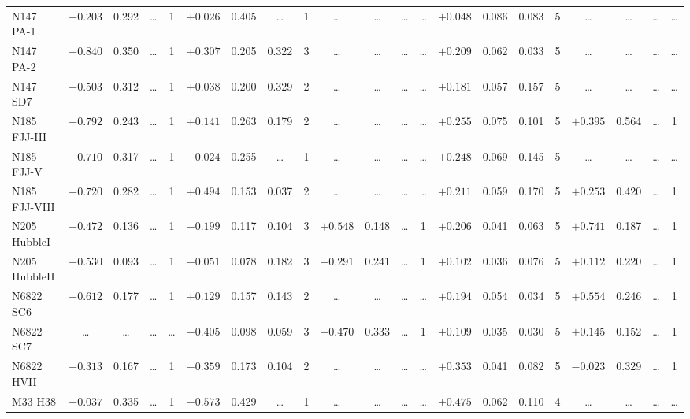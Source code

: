 \documentclass{aa}
\begin{document}
\begin{appendix}
\begin{table*}
\begin{adjustbox}{width=1\textwidth}
{\begin{tabular}{l cccccccccccccccccccc}
N147 PA-1     & $-0.203$ & 0.292 & \ldots & 1 & $+0.026$ & 0.405 & \ldots & 1 & \ldots & \ldots & \ldots & \ldots & $+0.048$ & 0.086 & 0.083 & 5 & \ldots & \ldots & \ldots & \ldots \\
N147 PA-2     & $-0.840$ & 0.350 & \ldots & 1 & $+0.307$ & 0.205 & 0.322 & 3 & \ldots & \ldots & \ldots & \ldots & $+0.209$ & 0.062 & 0.033 & 5 & \ldots & \ldots & \ldots & \ldots \\
N147 SD7      & $-0.503$ & 0.312 & \ldots & 1 & $+0.038$ & 0.200 & 0.329 & 2 & \ldots & \ldots & \ldots & \ldots & $+0.181$ & 0.057 & 0.157 & 5 & \ldots & \ldots & \ldots & \ldots \\
N185 FJJ-III  & $-0.792$ & 0.243 & \ldots & 1 & $+0.141$ & 0.263 & 0.179 & 2 & \ldots & \ldots & \ldots & \ldots & $+0.255$ & 0.075 & 0.101 & 5 & $+0.395$ & 0.564 & \ldots & 1 \\
N185 FJJ-V    & $-0.710$ & 0.317 & \ldots & 1 & $-0.024$ & 0.255 & \ldots & 1 & \ldots & \ldots & \ldots & \ldots & $+0.248$ & 0.069 & 0.145 & 5 & \ldots & \ldots & \ldots & \ldots \\
N185 FJJ-VIII & $-0.720$ & 0.282 & \ldots & 1 & $+0.494$ & 0.153 & 0.037 & 2 & \ldots & \ldots & \ldots & \ldots & $+0.211$ & 0.059 & 0.170 & 5 & $+0.253$ & 0.420 & \ldots & 1 \\
N205 HubbleI  & $-0.472$ & 0.136 & \ldots & 1 & $-0.199$ & 0.117 & 0.104 & 3 & $+0.548$ & 0.148 & \ldots & 1 & $+0.206$ & 0.041 & 0.063 & 5 & $+0.741$ & 0.187 & \ldots & 1 \\
N205 HubbleII & $-0.530$ & 0.093 & \ldots & 1 & $-0.051$ & 0.078 & 0.182 & 3 & $-0.291$ & 0.241 & \ldots & 1 & $+0.102$ & 0.036 & 0.076 & 5 & $+0.112$ & 0.220 & \ldots & 1 \\
N6822 SC6     & $-0.612$ & 0.177 & \ldots & 1 & $+0.129$ & 0.157 & 0.143 & 2 & \ldots & \ldots & \ldots & \ldots & $+0.194$ & 0.054 & 0.034 & 5 & $+0.554$ & 0.246 & \ldots & 1 \\
N6822 SC7     & \ldots & \ldots & \ldots & \ldots & $-0.405$ & 0.098 & 0.059 & 3 & $-0.470$ & 0.333 & \ldots & 1 & $+0.109$ & 0.035 & 0.030 & 5 & $+0.145$ & 0.152 & \ldots & 1 \\
N6822 HVII    & $-0.313$ & 0.167 & \ldots & 1 & $-0.359$ & 0.173 & 0.104 & 2 & \ldots & \ldots & \ldots & \ldots & $+0.353$ & 0.041 & 0.082 & 5 & $-0.023$ & 0.329 & \ldots & 1 \\
M33 H38       & $-0.037$ & 0.335 & \ldots & 1 & $-0.573$ & 0.429 & \ldots & 1 & \ldots & \ldots & \ldots & \ldots & $+0.475$ & 0.062 & 0.110 & 4 & \ldots & \ldots & \ldots & \ldots \\

\end{tabular}}
\end{adjustbox}
\end{table*}
\end{appendix}
\end{document}
